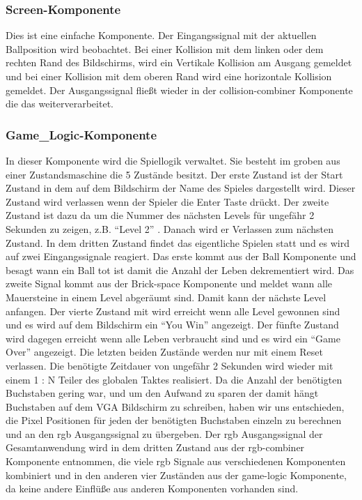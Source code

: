 \documentclass{scrartcl}
\begin{document}
\subsubsection{Screen-Komponente}
Dies ist eine einfache Komponente.
Der Eingangssignal mit der aktuellen Ballposition wird beobachtet.
Bei einer Kollision mit dem linken oder dem rechten Rand  des Bildschirms, wird
ein Vertikale Kollision am Ausgang gemeldet und bei einer Kollision mit dem
oberen Rand wird eine horizontale Kollision gemeldet.
Der Ausgangssignal fließt wieder in der collision-combiner Komponente die das
weiterverarbeitet.


\subsubsection{Game\_Logic-Komponente}
In dieser Komponente wird die Spiellogik verwaltet.
Sie besteht im groben aus einer Zustandsmaschine die 5 Zustände besitzt.
Der erste Zustand ist der Start Zustand in dem auf dem Bildschirm der Name des
Spieles dargestellt wird.
Dieser Zustand wird verlassen wenn der Spieler die Enter Taste drückt.
Der zweite Zustand ist dazu da um die Nummer des nächsten Levels für ungefähr 2
Sekunden zu zeigen, z.B. "`Level 2"' . Danach wird er Verlassen zum nächsten
Zustand. In dem dritten Zustand findet das eigentliche Spielen statt und es wird
auf zwei Eingangssignale reagiert. Das erste kommt aus der Ball Komponente und
besagt wann ein Ball tot ist damit die Anzahl der Leben dekrementiert wird. Das
zweite Signal kommt aus der Brick-space Komponente und meldet wann alle
Mauersteine in einem Level abgeräumt sind. Damit kann der nächste Level
anfangen. Der vierte Zustand mit wird erreicht wenn alle Level gewonnen sind
und es wird auf dem Bildschirm ein "`You Win"' angezeigt. Der fünfte Zustand
wird dagegen erreicht wenn alle Leben verbraucht sind und es wird ein "`Game
Over"' angezeigt. Die letzten beiden Zustände werden nur mit einem Reset
verlassen. Die benötigte Zeitdauer von ungefähr 2 Sekunden wird wieder mit einem
1 : N  Teiler des globalen Taktes realisiert. Da die Anzahl der benötigten
Buchstaben gering war, und um den Aufwand zu sparen der damit hängt Buchstaben
auf dem VGA Bildschirm zu schreiben, haben wir uns entschieden, die Pixel
Positionen für jeden der benötigten Buchstaben einzeln zu berechnen und an den
rgb Ausgangssignal zu übergeben. Der rgb Ausgangssignal der Gesamtanwendung wird
in dem dritten Zustand aus der rgb-combiner Komponente entnommen, die viele rgb
Signale aus verschiedenen Komponenten kombiniert und in den anderen vier
Zuständen aus der game-logic Komponente, da keine andere Einflüße aus anderen
Komponenten vorhanden sind.
\end{document}
